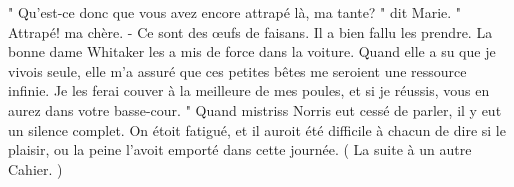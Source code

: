 " Qu'est-ce donc que vous avez encore attrapé là, ma tante? " dit Marie.
" Attrapé! ma chère. - Ce sont des œufs de faisans. Il a bien fallu les prendre. La bonne dame Whitaker les a mis de force dans la voiture. Quand elle a su que je vivois seule, elle m'a assuré que ces petites bêtes me seroient une ressource infinie. Je les ferai couver à la meilleure de mes poules, et si je réussis, vous en aurez dans votre basse-cour. "
Quand mistriss Norris eut cessé de parler, il y eut un silence complet. On étoit fatigué, et il auroit été difficile à chacun de dire si le plaisir, ou la peine l'avoit emporté dans cette journée.
\small{( La suite à un autre Cahier. )}